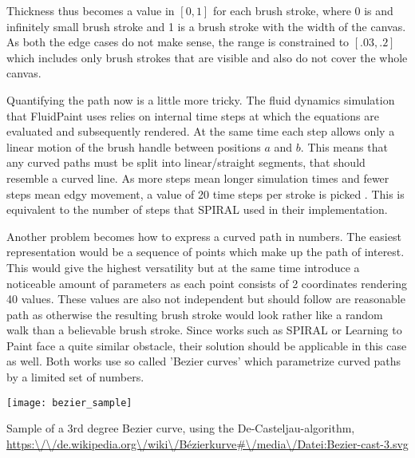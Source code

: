 Thickness thus becomes a value in $[0, 1]$  for each brush stroke, where 0 is and
infinitely small brush stroke and 1 is a brush stroke with the width of the canvas.
As both the edge cases do not make sense, the range is constrained to $[.03, .2]$
which includes only brush strokes that are visible and also do not cover the whole canvas.

Quantifying the path now is a little more tricky.
The fluid dynamics simulation that FluidPaint uses relies on internal time steps
at which the equations are evaluated and subsequently rendered.
At the same time each step allows only a linear motion of the brush handle between
positions $a$ and $b$.
This means that any curved paths must be split into linear/straight segments, that
should resemble a curved line.
As more steps mean longer simulation times and fewer steps mean edgy movement, a
value of 20 time steps per stroke is picked .
This is equivalent to the number of steps that SPIRAL used in their implementation.

Another problem becomes how to express a curved path in numbers.
The easiest representation would be a sequence of points which make up the path of
interest.
This would give the highest versatility but at the same time introduce a noticeable
amount of parameters as each point consists of 2 coordinates rendering 40 values.
These values are also not independent but should follow are reasonable path as otherwise
the resulting brush stroke would look rather like a random walk than a believable
brush stroke.
Since works such as SPIRAL or Learning to Paint face a quite similar obstacle, their
solution should be applicable in this case as well.
Both works use so called 'Bezier curves' which parametrize curved paths by a limited
set of numbers.
\begin{marginfigure}
    \texttt{[image: bezier\_sample]}
    \caption[]{Sample of a 3rd degree Bezier curve, using the De-Casteljau-algorithm,
    \url{https:\/\/de.wikipedia.org\/wiki\/Bézierkurve\#\/media\/Datei:Bezier-cast-3.svg}}
\end{marginfigure}

